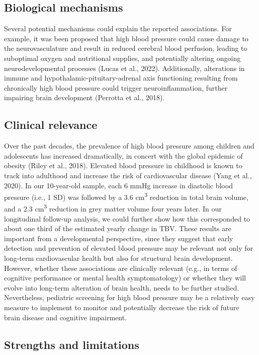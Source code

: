 \documentclass[
  letterpaper,
  DIV=11,
  numbers=noendperiod]{scrreport}
\begin{document}
\subsection{Biological mechanisms}\label{biological-mechanisms}

Several potential mechanisms could explain the reported associations.
For example, it was been proposed that high blood pressure could cause
damage to the neurovasculature and result in reduced cerebral blood
perfusion, leading to suboptimal oxygen and nutritional supplies, and
potentially altering ongoing neurodevelopmental processes (Lucas et al.,
2022). Additionally, alterations in immune and
hypothalamic-pituitary-adrenal axis functioning resulting from
chronically high blood pressure could trigger neuroinflammation, further
impairing brain development (Perrotta et al., 2018).

\subsection{Clinical relevance}\label{clinical-relevance}

Over the past decades, the prevalence of high blood pressure among
children and adolescents has increased dramatically, in concert with the
global epidemic of obesity (Riley et al., 2018). Elevated blood pressure
in childhood is known to track into adulthood and increase the risk of
cardiovascular disease (Yang et al., 2020). In our 10-year-old sample,
each 6 mmHg increase in diastolic blood pressure (i.e., 1 SD) was
followed by a 3.6 cm\textsuperscript{3} reduction in total brain volume,
and a 2.3 cm\textsuperscript{3} reduction in grey matter volume four
years later. In our longitudinal follow-up analysis, we could further
show how this corresponded to about one third of the estimated yearly
change in TBV. These results are important from a developmental
perspective, since they suggest that early detection and prevention of
elevated blood pressure may be relevant not only for long-term
cardiovascular health but also for structural brain development.
However, whether these associations are clinically relevant (e.g., in
terms of cognitive performance or mental health symptomatology) or
whether they will evolve into long-term alteration of brain health,
needs to be further studied. Nevertheless, pediatric screening for high
blood pressure may be a relatively easy measure to implement to monitor
and potentially decrease the risk of future brain disease and cognitive
impairment.

\subsection{Strengths and limitations}\label{strengths-and-limitations}
\end{document}
